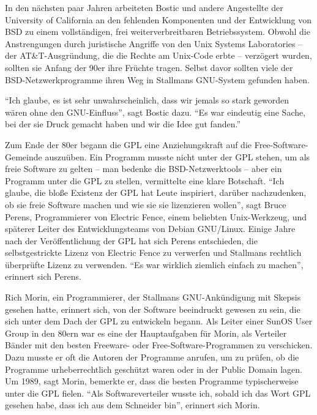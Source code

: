 In den nächsten paar Jahren arbeiteten Bostic und andere Angestellte der University of California an den fehlenden Komponenten und der Entwicklung von BSD zu einem vollständigen, frei weiterverbreitbaren Betriebssystem. Obwohl die Anstrengungen durch juristische Angriffe von den Unix Systems Laboratories – der AT\&T-Ausgründung, die die Rechte am Unix-Code erbte – verzögert wurden, sollten sie Anfang der 90er ihre Früchte tragen. Selbst davor sollten viele der BSD-Netzwerkprogramme ihren Weg in Stallmans GNU-System gefunden haben.

"`Ich glaube, es ist sehr unwahrscheinlich, dass wir jemals so stark geworden wären ohne den GNU-Einfluss"', sagt Bostic dazu. "`Es war eindeutig eine Sache, bei der sie Druck gemacht haben und wir die Idee gut fanden."'

Zum Ende der 80er begann die GPL eine Anziehungskraft auf die Free-Software-Gemeinde auszuüben. Ein Programm musste nicht unter der GPL stehen, um als freie Software zu gelten – man bedenke die BSD-Netzwerktools – aber ein Programm unter die GPL zu stellen, vermittelte eine klare Botschaft. "`Ich glaube, die bloße Existenz der GPL hat Leute inspiriert, darüber nachzudenken, ob sie freie Software machen und wie sie sie lizenzieren wollen"', sagt Bruce Perens, Programmierer von Electric Fence, einem beliebten Unix-Werkzeug, und späterer Leiter des Entwicklungsteams von Debian GNU/Linux. Einige Jahre nach der Veröffentlichung der GPL hat sich Perens entschieden, die selbstgestrickte Lizenz von Electric Fence zu verwerfen und Stallmans rechtlich überprüfte Lizenz zu verwenden. "`Es war wirklich ziemlich einfach zu machen"', erinnert sich Perens.

Rich Morin, ein Programmierer, der Stallmans GNU-Ankündigung mit Skepsis gesehen hatte, erinnert sich, von der Software beeindruckt gewesen zu sein, die sich unter dem Dach der GPL zu entwickeln begann. Als Leiter einer Sun\-OS User Group in den 80ern war es eine der Hauptaufgaben für Morin, als Verteiler Bänder mit den besten Freeware- oder Free-Software-Programmen zu verschicken. Dazu musste er oft die Autoren der Programme anrufen, um zu prüfen, ob die Programme urheberrechtlich geschützt waren oder in der Public Domain lagen. Um 1989, sagt Morin, bemerkte er, dass die besten Programme typischerweise unter die GPL fielen. "`Als Softwareverteiler wusste ich, sobald ich das Wort \glq GPL\grq{} gesehen habe, dass ich aus dem Schneider bin"', erinnert sich Morin.

